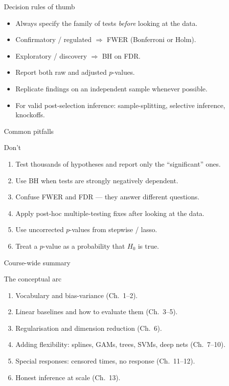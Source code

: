 \documentclass[aspectratio=169,11pt]{beamer}
\begin{document}
\begin{frame}{Decision rules of thumb}
  \begin{itemize}
    \item Always specify the family of tests \emph{before} looking at
          the data.
    \item Confirmatory / regulated $\Rightarrow$ FWER (Bonferroni or
          Holm).
    \item Exploratory / discovery $\Rightarrow$ BH on FDR.
    \item Report both raw and adjusted $p$-values.
    \item Replicate findings on an independent sample whenever
          possible.
    \item For valid post-selection inference: sample-splitting,
          selective inference, knockoffs.
  \end{itemize}
\end{frame}

\begin{frame}{Common pitfalls}
  \begin{alertblock}{Don't}
    \begin{enumerate}
      \item Test thousands of hypotheses and report only the
            ``significant'' ones.
      \item Use BH when tests are strongly negatively dependent.
      \item Confuse FWER and FDR --- they answer different questions.
      \item Apply post-hoc multiple-testing fixes after looking at
            the data.
      \item Use uncorrected $p$-values from stepwise / lasso.
      \item Treat a $p$-value as a probability that $H_0$ is true.
    \end{enumerate}
  \end{alertblock}
\end{frame}

\begin{frame}{Course-wide summary}
  \begin{block}{The conceptual arc}
    \begin{enumerate}
      \item Vocabulary and bias-variance (Ch.~1--2).
      \item Linear baselines and how to evaluate them (Ch.~3--5).
      \item Regularisation and dimension reduction (Ch.~6).
      \item Adding flexibility: splines, GAMs, trees, SVMs, deep nets
            (Ch.~7--10).
      \item Special responses: censored times, no response
            (Ch.~11--12).
      \item Honest inference at scale (Ch.~13).
    \end{enumerate}
  \end{block}
\end{frame}
\end{document}
